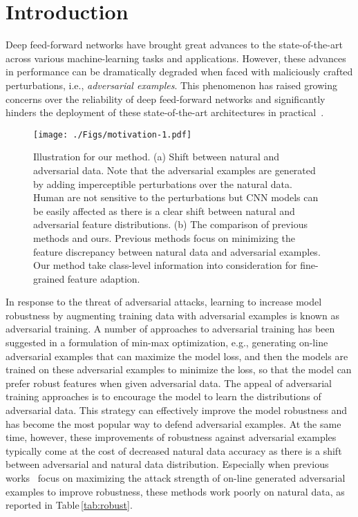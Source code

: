\documentclass[10pt,twocolumn,letterpaper]{article}
\begin{document}
\section{Introduction}
Deep feed-forward networks have brought great advances to the state-of-the-art across various machine-learning tasks and applications. However, these advances in performance can be dramatically degraded when faced with maliciously crafted perturbations, i.e., \textit{adversarial examples}. This phenomenon has raised growing concerns over the reliability of deep feed-forward networks and significantly hinders the deployment of these state-of-the-art architectures in practical~\cite{64xie2017adversarial,Sayles_2021_CVPR,Hendrycks_2021_CVPR,Wu_2021_CVPR,Pony_2021_CVPR}. 

\begin{figure}[!t]
\centering
\texttt{[image: ./Figs/motivation-1.pdf]}
    \caption{%
    Illustration for our method. (a) Shift between natural and adversarial data. Note that the adversarial examples are generated by adding imperceptible perturbations over the natural data. Human are not sensitive to the perturbations but CNN models can be easily affected as there is a clear shift between natural and adversarial feature distributions. (b) The comparison of previous methods and ours. Previous methods focus on minimizing the feature discrepancy between natural data and adversarial examples. Our method take class-level information into consideration for fine-grained feature adaption.}
    \vspace{-15pt}
\label{fig:introduction}
\end{figure}

In response to the threat of adversarial attacks, learning to increase model robustness by augmenting training data with adversarial examples is known as adversarial training. A number of approaches to adversarial training has been suggested in a formulation of min-max optimization, e.g., generating on-line adversarial examples that can maximize the model loss, and then the models are trained on these adversarial examples to minimize the loss, so that the model can prefer robust features when given adversarial data. The appeal of adversarial training approaches is to encourage the model to learn the distributions of adversarial data. This strategy can effectively improve the model robustness and has become the most popular way to defend adversarial examples. At the same time, however, these improvements of robustness against adversarial examples typically come at the cost of decreased natural data accuracy as there is a shift between adversarial and natural data distribution. Especially when previous works~\cite{madry2018towards, zheng2020efficient} focus on maximizing the attack strength of on-line generated adversarial examples to improve robustness, these methods work poorly on natural data, as reported in Table\,\ref{tab:robust}.
\end{document}
